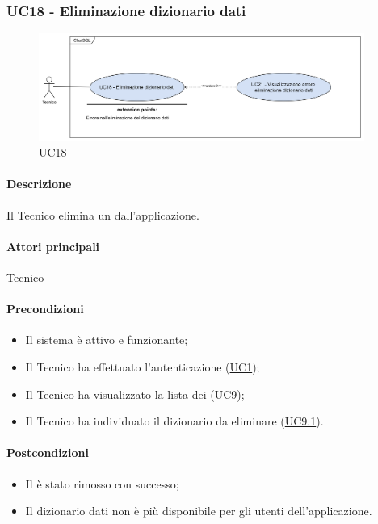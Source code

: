 \subsubsection{UC18 - Eliminazione dizionario dati}\label{UC18}

\begin{figure}[H]
  \centering
  \includegraphics[width=0.95\textwidth]{assets/uc18.png}
  \caption{UC18}
\end{figure}

\paragraph*{Descrizione}
Il Tecnico elimina un  dall'applicazione.

\paragraph*{Attori principali}
Tecnico

\paragraph*{Precondizioni}
\begin{itemize}
  \item Il sistema è attivo e funzionante;
  \item Il Tecnico ha effettuato l'autenticazione (\hyperref[UC1]{UC1});
  \item Il Tecnico ha visualizzato la lista dei  (\hyperref[UC9]{UC9});
  \item Il Tecnico ha individuato il dizionario da eliminare (\hyperref[UC9.1]{UC9.1}).
\end{itemize}

\paragraph*{Postcondizioni}
\begin{itemize}
  \item Il  è stato rimosso con successo;
  \item Il dizionario dati non è più disponibile per gli utenti dell'applicazione.
\end{itemize}

